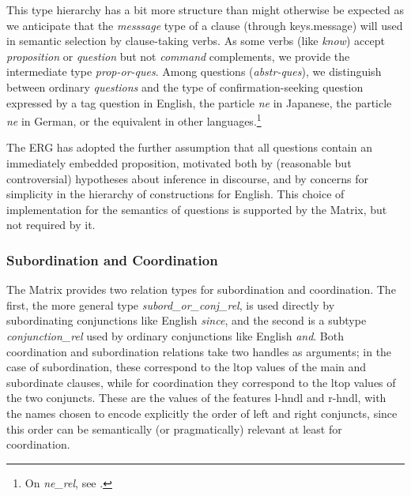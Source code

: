 \documentclass[12pt]{article}
\newcommand{\es}{\enumsentence}
\newcommand{\fn}{\footnote}
\begin{document}
This type hierarchy has a bit more structure than might otherwise be
expected as we anticipate that the {\it messsage} type of a clause (through
{\sc keys.message}) will used in semantic selection by
clause-taking verbs.  As some verbs (like {\it know}) accept {\it
proposition} or {\it question} but not {\it command} complements, we
provide the intermediate type {\it prop-or-ques}.
Among questions ({\it abstr-ques}), we distinguish between
ordinary {\it questions} and the type of confirmation-seeking
question expressed by a tag question in English, the particle {\it ne}
in Japanese, the particle {\it ne} in German, or the equivalent in
other languages.\fn{On {\it ne\_rel}, see .}

The ERG has adopted the further assumption that all questions contain an
immediately embedded proposition, motivated both by (reasonable but
controversial) hypotheses about inference in discourse, and by concerns for
simplicity in the hierarchy of constructions for English.  This choice of
implementation for the semantics of questions is supported by the Matrix, but 
not required by it.

\subsubsection{Subordination and Coordination}
\label{coordsec}

The Matrix provides two relation types for subordination and coordination. 
The first, the more general type {\it subord\_or\_conj\_rel}, is used directly
by subordinating conjunctions like English {\it since}, and the second is a 
subtype {\it conjunction\_rel} used by ordinary conjunctions like English 
{\it and}.  Both coordination and subordination relations take two handles as 
arguments; in the
case of subordination, these correspond to the {\sc ltop} values of
the main and subordinate clauses, while for coordination they correspond to
the {\sc ltop} values of the two conjuncts.  These
are the values of the features {\sc l-hndl} and {\sc r-hndl}, with the names
chosen to encode explicitly the order of left and right conjuncts,
since this order can be semantically (or pragmatically) relevant at least for
coordination.

\es{
\begin{avm}
{\it subord\_or\_conj\_rel}: \[ l-hndl & handle\\
                                r-hndl & handle \]
\end{avm}
}
\end{document}
